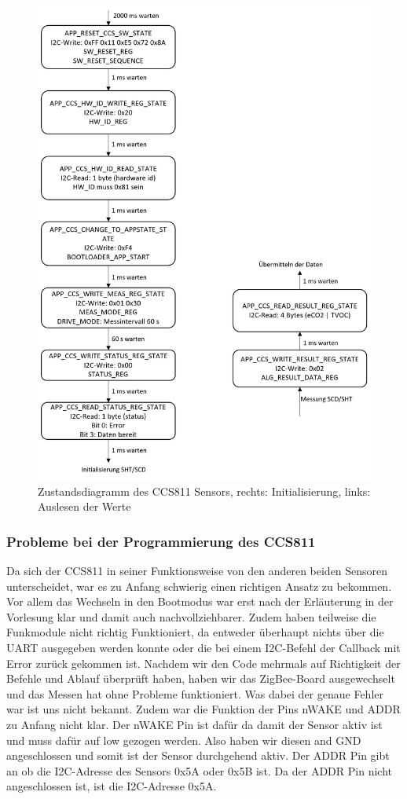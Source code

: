 \documentclass[]{article}
\begin{document}
			\begin{figure}[!h]
				\centering
				\includegraphics[scale=0.30]{images/ccs_zustandsdiagramm}
				\caption{Zustandsdiagramm des CCS811 Sensors, rechts: Initialisierung, links: Auslesen der Werte}
				\label{img:ccs_zustandsdiagramm}
			\end{figure}
				\subsubsection{Probleme bei der Programmierung des CCS811}
					Da sich der CCS811 in seiner Funktionsweise von den anderen beiden Sensoren unterscheidet, war es zu Anfang schwierig einen richtigen Ansatz zu bekommen. Vor allem das Wechseln in den Bootmodus war erst nach der Erläuterung in der Vorlesung klar und damit auch nachvollziehbarer. Zudem haben teilweise die Funkmodule nicht richtig Funktioniert, da entweder überhaupt nichts über die UART ausgegeben werden konnte oder die bei einem I2C-Befehl der Callback mit Error zurück gekommen ist. Nachdem wir den Code mehrmals auf Richtigkeit der Befehle und Ablauf überprüft haben, haben wir das ZigBee-Board ausgewechselt und das Messen hat ohne Probleme funktioniert. Was dabei der genaue Fehler war ist uns nicht bekannt. Zudem war die Funktion der Pins nWAKE und ADDR zu Anfang nicht klar. Der nWAKE Pin ist dafür da damit der Sensor aktiv ist und muss dafür auf low gezogen werden. Also haben wir diesen and GND angeschlossen und somit ist der Sensor durchgehend aktiv. Der ADDR Pin gibt an ob die I2C-Adresse des Sensors 0x5A oder 0x5B ist. Da der ADDR Pin nicht angeschlossen ist, ist die I2C-Adresse 0x5A.
\end{document}

